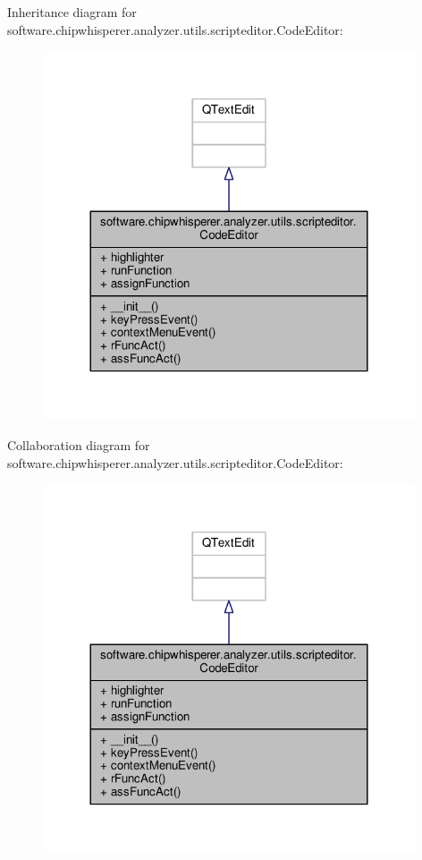 Inheritance diagram for software.\+chipwhisperer.\+analyzer.\+utils.\+scripteditor.\+Code\+Editor\+:\nopagebreak
\begin{figure}[H]
\begin{center}
\leavevmode
\includegraphics[width=312pt]{d9/d67/classsoftware_1_1chipwhisperer_1_1analyzer_1_1utils_1_1scripteditor_1_1CodeEditor__inherit__graph}
\end{center}
\end{figure}


Collaboration diagram for software.\+chipwhisperer.\+analyzer.\+utils.\+scripteditor.\+Code\+Editor\+:\nopagebreak
\begin{figure}[H]
\begin{center}
\leavevmode
\includegraphics[width=312pt]{d5/d4d/classsoftware_1_1chipwhisperer_1_1analyzer_1_1utils_1_1scripteditor_1_1CodeEditor__coll__graph}
\end{center}
\end{figure}


